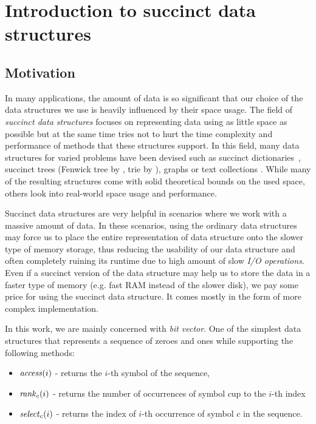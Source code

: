 \chapter{Introduction to succinct data structures}
\label{kap:kap1}

\section{Motivation}


In many applications, the amount of data is so significant that our choice of
the data structures we use is heavily influenced by their space usage. The field
of \textit{succinct data structures} focuses on representing data using as little
space as possible but at the same time tries not to hurt the time complexity and
performance of methods that these structures support. In this field, many data structures
for varied problems have been devised such as succinct dictionaries~\citep{raman2007succinct},
succinct trees (Fenwick tree by \cite{bille2017succinct}, trie by \cite{grossi2015fast}),
graphs \citep{farzan2013succinct} or text collections \citep{ferragina2000opportunistic}.
While many of the resulting structures come with solid theoretical bounds on the used space,
others look into real-world space usage and performance.

Succinct data structures are very helpful in scenarios where we work with a massive amount of
data. In these scenarios, using the ordinary data structures may force us to place
the entire representation of data structure onto the slower type of memory storage, thus
reducing the usability of our data structure and often completely ruining its runtime due to
high amount of slow \textit{I/O operations}. Even if a succinct version of the data structure
may help us to store the data in a faster type of memory (e.g. fast RAM instead of the slower disk),
we pay some price for using the succinct data structure. It comes mostly in the form of more
complex implementation.

In this work, we are mainly concerned with \textit{bit vector}. One of the simplest
data structures that represents a sequence of zeroes and ones while supporting the
following methods:
\begin{itemize}
\item $\mathit{access}(i)$ - returns the $i$-th symbol of the sequence,
\item $\mathit{rank}_c(i)$ - returns the number of occurrences of symbol $c$up to the $i$-th index
\item $\mathit{select}_c(i)$ - returns the index of $i$-th occurrence of symbol $c$ in the sequence.
\end{itemize}

